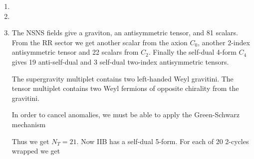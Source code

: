\documentclass[11pt, class=article, crop=false]{standalone}
\begin{document}
\begin{enumerate}
	To
	
	\item 
	
	\item 
	
	\item The NSNS fields give a graviton, an antisymmetric tensor, and 81 scalars. From the RR sector we get another scalar from the axion $C_0$, another 2-index antisymmetric tensor and 22 scalars from $C_2$. Finally the self-dual 4-form $C_4$ gives 19 anti-self-dual and 3 self-dual two-index antisymmetric tensors. 
	
	The supergravity multiplet contains two left-handed Weyl gravitini. The tensor multiplet contains two Weyl fermions of opposite chirality from the gravitini. 
	
	In order to cancel anomalies, we must be able to apply the Green-Schwarz mechanism
	
	Thus we get $N_{T} = 21$. Now IIB has a self-dual 5-form. For each of 20 2-cycles wrapped we get 
	
	
	
\end{enumerate}

\end{document}
